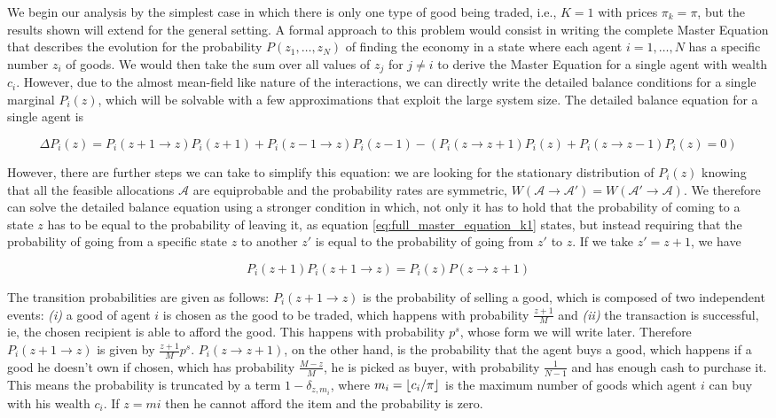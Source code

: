 We begin our analysis by the simplest case in which there is only one type of good being traded, i.e., $K=1$ with prices $\pi_k = \pi$, but the results shown will extend for the general setting. A formal approach to this problem would consist in writing the complete Master Equation that describes the evolution for the probability $P(z_1,\ldots, z_N)$ of finding the economy in a state where each agent $i=1,\ldots,N$ has a specific number $z_i$ of goods. We would then take the sum over all values of $z_j$ for $j\neq i$ to derive the Master Equation for a single agent with wealth $c_i$. However, due to the almost mean-field like nature of the interactions, we can directly write the detailed balance conditions for a single marginal $P_i(z)$, which will be solvable with a few approximations that exploit the large system size. The detailed balance equation for a single agent is

\begin{equation}
    \Delta P_i(z) =  P_i(z+1 \to z) P_i(z+1) + P_i(z-1 \to z) P_i(z-1) - \left (P_i(z \to z + 1) P_i(z) + P_i(z \to z - 1) P_i(z) = 0 \right)
    \label{eq:full_master_equation_k1}
\end{equation}

However, there are further steps we can take to simplify this equation: we are looking for the stationary distribution of $P_i(z)$ knowing that all the feasible allocations $\mathcal{A}$ are equiprobable and the probability rates are symmetric, $W(\mathcal{A}\to \mathcal{A}') = W(\mathcal{A}'\to \mathcal{A})$. We therefore can solve the detailed balance equation using a stronger condition in which, not only it has to hold that the probability of coming to a state $z$ has to be equal to the probability of leaving it, as equation \eqref{eq:full_master_equation_k1} states, but instead requiring that the probability of going from a specific state $z$ to another $z'$ is equal to the probability of going from $z'$ to $z$. If we take $z' = z + 1$, we have

\begin{equation}
P_i(z + 1) P_i(z + 1 \to z) = P_i(z) P(z \to z + 1)
\end{equation}

The transition probabilities are given as follows: $P_i(z + 1 \to z)$ is the probability of selling a good, which is composed of two independent events: \emph{(i)} a good of agent $i$ is chosen as the good to be traded, which happens with probability $\frac{z+1}{M}$ and \emph{(ii)} the transaction is successful, ie, the chosen recipient is able to afford the good. This happens with probability $p^s$, whose form we will write later. Therefore $P_i(z + 1 \to z)$ is given by $\frac{z+1}{M}  p^s$. $P_i(z \to z+1)$, on the other hand, is the probability that the agent buys a good, which happens if a good he doesn't own if chosen, which has probability $\frac{M - z}{M}$, he is picked as buyer, with probability $\frac{1}{N-1}$ and has enough cash to purchase it. This means the probability is truncated by a term $1-\delta_{z, m_{i}}$, where $m_{i}=\lfloor c_i / \pi\rfloor$ is the maximum number of goods which agent $i$ can buy with his wealth $c_i$. If $z=m{i}$ then he cannot afford the item and the probability is zero.


